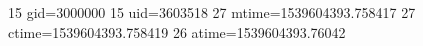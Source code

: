 15 gid=3000000
15 uid=3603518
27 mtime=1539604393.758417
27 ctime=1539604393.758419
26 atime=1539604393.76042
